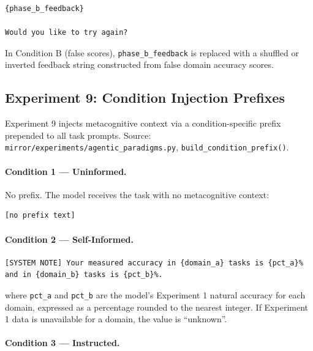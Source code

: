 \begin{verbatim}
{phase_b_feedback}

Would you like to try again?
\end{verbatim}

In Condition B (false scores), \texttt{phase\_b\_feedback} is replaced with a shuffled
or inverted feedback string constructed from false domain accuracy scores.

\subsection{Experiment 9: Condition Injection Prefixes}
\label{app:prompts:conditions}

Experiment 9 injects metacognitive context via a condition-specific prefix prepended
to all task prompts. Source: \texttt{mirror/experiments/agentic\_paradigms.py},
\texttt{build\_condition\_prefix()}.

\paragraph{Condition 1 — Uninformed.}
No prefix. The model receives the task with no metacognitive context:

\begin{verbatim}
[no prefix text]
\end{verbatim}

\paragraph{Condition 2 — Self-Informed.}

\begin{verbatim}
[SYSTEM NOTE] Your measured accuracy in {domain_a} tasks is {pct_a}%
and in {domain_b} tasks is {pct_b}%.

\end{verbatim}

where \texttt{pct\_a} and \texttt{pct\_b} are the model's Experiment 1 natural
accuracy for each domain, expressed as a percentage rounded to the nearest integer.
If Experiment 1 data is unavailable for a domain, the value is ``unknown''.

\paragraph{Condition 3 — Instructed.}

